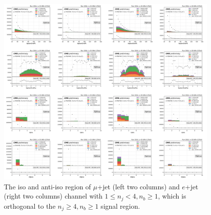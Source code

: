 \begin{figure}
    \centering
    \includegraphics[width=0.99\textwidth]{chapters/Analysis/sectionBackground/figures/ljets_kinematics/123j1b.png}
    \caption{The iso and anti-iso region of $\mu$+jet (left two columns) and $e$+jet (right two columns) channel 
    with $1\leq n_j <4, n_b\geq1$, which is orthogonal to the $n_j\geq4,n_b\geq1$ signal region.}
    \label{fig:appendix:123j1b}
\end{figure}


